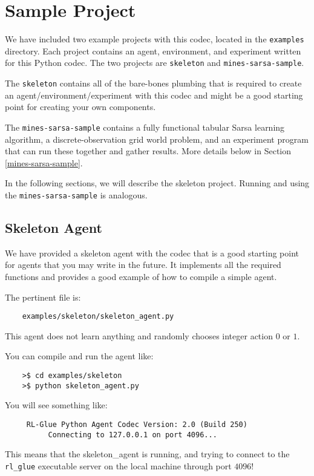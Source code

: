 \documentclass[11pt]{article}
\begin{document}
\section{Sample Project}
We have included two example projects with this codec, located in the \texttt{examples} directory.  Each project contains an agent, environment, and experiment written for this Python codec.  The two projects are \texttt{skeleton} and \texttt{mines-sarsa-sample}.

The \texttt{skeleton} contains all of the bare-bones plumbing that is required to create an agent/environment/experiment with this codec and might be a good starting point for creating your own components.

The \texttt{mines-sarsa-sample} contains a fully functional tabular Sarsa learning algorithm, a discrete-observation grid world problem, and an experiment program that can run these together and gather results.  More details below in Section \ref{mines-sarsa-sample}.

In the following sections, we will describe the skeleton project.  Running and using the \texttt{mines-sarsa-sample} is analogous.


\subsection{Skeleton Agent}
\label{sec:agent}
We have provided a skeleton agent with the codec that is a good starting point for agents that you may write in the future.
It implements all the required functions and provides a good example of how to compile a simple agent.

The pertinent file is:
\begin{verbatim}
	examples/skeleton/skeleton_agent.py
\end{verbatim}

This agent does not learn anything and randomly chooses integer action $0$ or $1$.  

You can compile and run the agent like:
\begin{verbatim}
	>$ cd examples/skeleton
	>$ python skeleton_agent.py
\end{verbatim}

You will see something like:
\begin{verbatim}
     RL-Glue Python Agent Codec Version: 2.0 (Build 250)
          Connecting to 127.0.0.1 on port 4096...
\end{verbatim}

This means that the skeleton\_agent is running, and trying to connect to the \texttt{rl\_glue} executable server on the local machine through port $4096$! 
\end{document}
